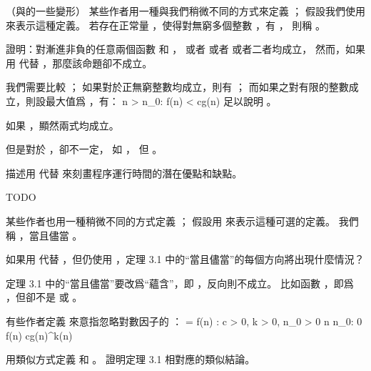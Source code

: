 \stopigBase
\stopPROBLEM

\startPROBLEM
（與\m{\Omega}的一些變形）
某些作者用一種與我們稍微不同的方式來定義 \m{\Omega}；
假設我們使用 \m{\mathop{\Omega}\limits^{\infty}} 來表示這種定義。
若存在正常量 ，使得對無窮多個整數 ，有 ，
則稱 。
\startigBase[a]
\item 證明：對漸進非負的任意兩個函數  和 ，
或者  或者  或者二者均成立，
然而，如果用 \m{\Omega} 代替 \m{\mathop{\Omega}\limits^{\infty}}，那麼該命題卻不成立。

\startANSWER
我們需要比較 ；
如果對於正無窮整數均成立，則有 \m{\mathop{\Omega}\limits^{\infty}}；
而如果之對有限的整數成立，則設最大值爲 ，有：
\startformula
\forall n > n_0: f(n) < cg(n)
\stopformula
足以說明 。

如果 ，顯然兩式均成立。

但是對於 \m{\Omega}，卻不一定，
如 ，
但 。
\stopANSWER

\item 描述用 \m{\mathop{\Omega}\limits^{\infty}} 代替 \m{\Omega} 來刻畫程序運行時間的潛在優點和缺點。

\startANSWER
TODO
\stopANSWER

\stopigBase

某些作者也用一種稍微不同的方式定義 ；
假設用  來表示這種可選的定義。
我們稱 ，當且儘當 。

\startigBase[a,continue]
\item 如果用  代替 ，但仍使用 \m{\Omega}，定理 3.1 中的“當且儘當”的每個方向將出現什麼情況？

\startANSWER
定理 3.1 中的“當且儘當”要改爲“蘊含”，即 ，反向則不成立。
比如函數 ，即爲 ，但卻不是  或 。
\stopANSWER
\stopigBase

有些作者定義  來意指忽略對數因子的 ：
\startformula
{} = \lbrace f(n) : \exists c > 0, k > 0, n_0 > 0 \forall n \geq n_0: 0 \leq f(n) \leq cg(n)\lg^k(n) \rbrace
\stopformula
\startigBase[a,continue]
\item 用類似方式定義 \m{\tilde{\Omega}} 和 \m{\tilde{\Theta}}。
證明定理 3.1 相對應的類似結論。

